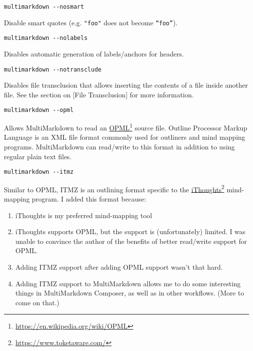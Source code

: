 \begin{verbatim}
multimarkdown --nosmart
\end{verbatim}

Disable smart quotes (e.g. \texttt{"foo"} does not become \texttt{“foo”}).

\begin{verbatim}
multimarkdown --nolabels
\end{verbatim}

Disables automatic generation of labels\slash anchors for headers.

\begin{verbatim}
multimarkdown --notransclude
\end{verbatim}

Disables file transclusion that allows inserting the contents of a file inside another file. See the section on {[File Transclusion]} for more information.

\begin{verbatim}
multimarkdown --opml
\end{verbatim}

Allows MultiMarkdown to read an \href{https://en.wikipedia.org/wiki/OPML}{OPML}\footnote{\href{https://en.wikipedia.org/wiki/OPML}{https:\slash \slash en.wikipedia.org\slash wiki\slash OPML}} source file. Outline Processor Markup Language is an XML file format commonly used for outliners and mind mapping programs. MultiMarkdown can read\slash write to this format in addition to using regular plain text files.

\begin{verbatim}
multimarkdown --itmz
\end{verbatim}

Similar to OPML, ITMZ is an outlining format specific to the \href{https://www.toketaware.com/}{iThoughts}\footnote{\href{https://www.toketaware.com/}{https:\slash \slash www.toketaware.com\slash }} mind-mapping program. I added this format because:

\begin{enumerate}
\item iThoughts is my preferred mind-mapping tool

\item iThoughts supports OPML, but the support is (unfortunately) limited. I was unable to convince the author of the benefits of better read\slash write support for OPML.

\item Adding ITMZ support after adding OPML support wasn't that hard.

\item Adding ITMZ support to MultiMarkdown allows me to do some interesting things in MultiMarkdown Composer, as well as in other workflows. (More to come on that.)

\end{enumerate}

